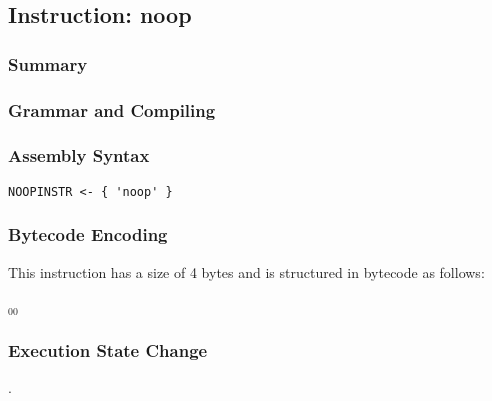 \subsection{Instruction: noop}

\subsubsection{Summary}


\subsubsection{Grammar and Compiling}


\subsubsection{Assembly Syntax}

\begin{myquote}
\begin{verbatim}
NOOPINSTR <- { 'noop' }
\end{verbatim}
\end{myquote}


\subsubsection{Bytecode Encoding}

This instruction has a size of 4 bytes and is structured in bytecode as follows:

$_{00}$\ 


\subsubsection{Execution State Change}

.


